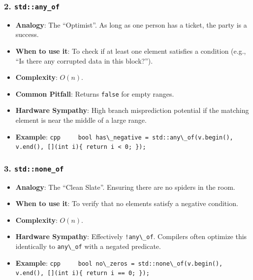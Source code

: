 \hypertarget{stdany_of}{%
\subsubsection{\texorpdfstring{2.
\texttt{std::any\_of}}{2. std::any\_of}}\label{stdany_of}}

\begin{itemize}
\tightlist
\item
  \textbf{Analogy}: The ``Optimist''. As long as one person has a
  ticket, the party is a success.
\item
  \textbf{When to use it}: To check if at least one element satisfies a
  condition (e.g., ``Is there any corrupted data in this block?'').
\item
  \textbf{Complexity}: \(O(n)\).
\item
  \textbf{Common Pitfall}: Returns \passthrough{\lstinline!false!} for
  empty ranges.
\item
  \textbf{Hardware Sympathy}: High branch misprediction potential if the
  matching element is near the middle of a large range.
\item
  \textbf{Example}:
  \passthrough{\lstinline!cpp     bool has\_negative = std::any\_of(v.begin(), v.end(), [](int i)\{ return i < 0; \});!}
\end{itemize}

\hypertarget{stdnone_of}{%
\subsubsection{\texorpdfstring{3.
\texttt{std::none\_of}}{3. std::none\_of}}\label{stdnone_of}}

\begin{itemize}
\tightlist
\item
  \textbf{Analogy}: The ``Clean Slate''. Ensuring there are no spiders
  in the room.
\item
  \textbf{When to use it}: To verify that no elements satisfy a negative
  condition.
\item
  \textbf{Complexity}: \(O(n)\).
\item
  \textbf{Hardware Sympathy}: Effectively
  \passthrough{\lstinline"!any\_of"}. Compilers often optimize this
  identically to \passthrough{\lstinline!any\_of!} with a negated
  predicate.
\item
  \textbf{Example}:
  \passthrough{\lstinline!cpp     bool no\_zeros = std::none\_of(v.begin(), v.end(), [](int i)\{ return i == 0; \});!}
\end{itemize}

